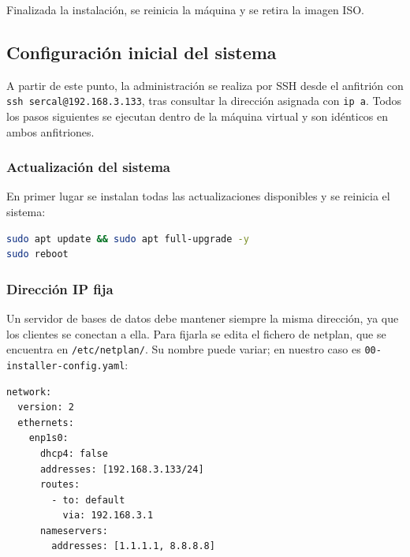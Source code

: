 
Finalizada la instalación, se reinicia la máquina y se retira la imagen ISO.

\subsection{Configuración inicial del sistema}

A partir de este punto, la administración se realiza por SSH desde el anfitrión con \texttt{ssh sercal@192.168.3.133}, tras consultar la dirección asignada con \texttt{ip a}. Todos los pasos siguientes se ejecutan dentro de la máquina virtual y son idénticos en ambos anfitriones.


\subsubsection{Actualización del sistema}

En primer lugar se instalan todas las actualizaciones disponibles y se reinicia el sistema:

\begin{lstlisting}[language=bash]
sudo apt update && sudo apt full-upgrade -y
sudo reboot
\end{lstlisting}

\subsubsection{Dirección IP fija}

Un servidor de bases de datos debe mantener siempre la misma dirección, ya que los clientes se conectan a ella. Para fijarla se edita el fichero de netplan, que se encuentra en \texttt{/etc/netplan/}. Su nombre puede variar; en nuestro caso es \texttt{00-installer-config.yaml}:

\begin{lstlisting}
network:
  version: 2
  ethernets:
    enp1s0:
      dhcp4: false
      addresses: [192.168.3.133/24]
      routes:
        - to: default
          via: 192.168.3.1
      nameservers:
        addresses: [1.1.1.1, 8.8.8.8]
\end{lstlisting}

